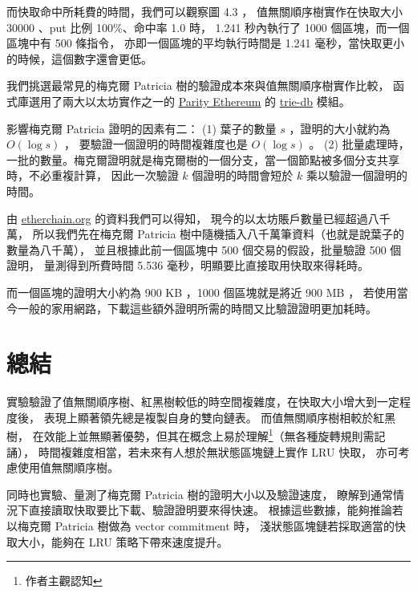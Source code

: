 而快取命中所耗費的時間，我們可以觀察圖 4.3 ，
值無關順序樹實作在快取大小 30000 、put 比例 100\%、命中率 1.0 時，
 1.241 秒內執行了 1000 個區塊，而一個區塊中有 500 條指令，
亦即一個區塊的平均執行時間是 1.241 毫秒，當快取更小的時候，這個數字還會更低。

我們挑選最常見的梅克爾 Patricia 樹的驗證成本來與值無關順序樹實作比較，
函式庫選用了兩大以太坊實作之一的 \href{https://www.parity.io/ethereum/}{Parity Ethereum}
的 \href{https://docs.rs/trie-db/0.20.1/trie_db/index.html}{trie-db} 模組。

影響梅克爾 Patricia 證明的因素有二：
(1) 葉子的數量 $s$ ，證明的大小就約為 $O(\log s)$ ， 要驗證一個證明的時間複雜度也是 $O(\log s)$ 。
(2) 批量處理時，一批的數量。梅克爾證明就是梅克爾樹的一個分支，當一個節點被多個分支共享時，不必重複計算，
因此一次驗證 $k$ 個證明的時間會短於 $k$ 乘以驗證一個證明的時間。

由 \href{https://www.etherchain.org/charts/totalAccounts}{etherchain.org} 的資料我們可以得知，
現今的以太坊賬戶數量已經超過八千萬，
所以我們先在梅克爾 Patricia 樹中隨機插入八千萬筆資料（也就是說葉子的數量為八千萬），
並且根據此前一個區塊中 500 個交易的假設，批量驗證 500 個證明，
量測得到所費時間 5.536 毫秒，明顯要比直接取用快取來得耗時。

而一個區塊的證明大小約為 900 KB ，1000 個區塊就是將近 900 MB ，
若使用當今一般的家用網路，下載這些額外證明所需的時間又比驗證證明更加耗時。

\section{總結}

實驗驗證了值無關順序樹、紅黑樹較低的時空間複雜度，在快取大小增大到一定程度後，
表現上顯著領先總是複製自身的雙向鏈表。 而值無關順序樹相較於紅黑樹，
在效能上並無顯著優勢，但其在概念上易於理解\footnote{作者主觀認知}（無各種旋轉規則需記誦），
時間複雜度相當，若未來有人想於無狀態區塊鏈上實作 LRU 快取，
亦可考慮使用值無關順序樹。

同時也實驗、量測了梅克爾 Patricia 樹的證明大小以及驗證速度，
瞭解到通常情況下直接讀取快取要比下載、驗證證明要來得快速。
根據這些數據，能夠推論若以梅克爾 Patricia 樹做為 vector commitment 時，
淺狀態區塊鏈若採取適當的快取大小，能夠在 LRU 策略下帶來速度提升。